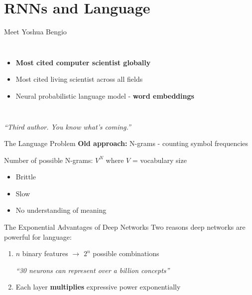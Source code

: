 \section{RNNs and Language}

\begin{frame}{Meet Yoshua Bengio}
    \begin{columns}
        
        \begin{itemize}
            \item \textbf{Most cited computer scientist globally}
            \item Most cited living scientist across all fields
            \item Neural probabilistic language model - \textbf{word embeddings}
        \end{itemize}
    \end{columns}
    
    \vspace{1em}
    \textit{``Third author. You know what's coming.''}
\end{frame}

\begin{frame}{The Language Problem}
    \textbf{Old approach:} N-grams - counting symbol frequencies
    
    \vspace{1em}
    Number of possible N-grams: $V^N$ where $V$ = vocabulary size
    
    \vspace{1em}
    \begin{itemize}
        \item Brittle
        \item Slow
        \item No understanding of meaning
    \end{itemize}
\end{frame}

\begin{frame}{The Exponential Advantages of Deep Networks}
    Two reasons deep networks are powerful for language:
    
    \vspace{1em}
    \begin{enumerate}
        \item $n$ binary features $\rightarrow$ $2^n$ possible combinations
        
        \textit{``30 neurons can represent over a billion concepts''}
        
        \item Each layer \textbf{multiplies} expressive power exponentially
    \end{enumerate}
\end{frame}

